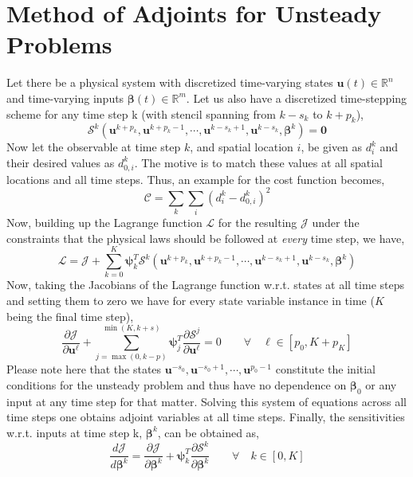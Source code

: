 \documentclass{article}
\begin{document}
\section{Method of Adjoints for Unsteady Problems}
    Let there be a physical system with discretized time-varying states $\boldsymbol{u}(t)\in\mathbb{R}^n$ and time-varying inputs $\boldsymbol{\beta}(t)\in
    \mathbb{R}^m$. Let us also have a discretized time-stepping scheme for any time step k (with stencil spanning from $k-s_k$ to $k+p_k$),
    $$
    \boldsymbol{\mathcal{S}}^k(\boldsymbol{u}^{k+p_k},   \boldsymbol{u}^{k+p_k-1}, \cdots, 
                               \boldsymbol{u}^{k-s_k+1}, \boldsymbol{u}^{k-s_k},   \boldsymbol{\beta}^k) = \boldsymbol{0}
    $$
    Now let the observable at time step $k$, and spatial location $i$, be given as $d_i^k$ and their desired values as $d_{0,i}^k$. The motive is to match these
    values at all spatial locations and all time steps. Thus, an example for the cost function becomes,
    $$
    \mathscr{C} = \sum_{k}{\sum_{i}{\left(d_i^k - d_{0,i}^k\right)^2}}
    $$
    Now, building up the Lagrange function $\mathscr{L}$ for the resulting $\mathscr{J}$ under the constraints that the physical laws should be followed at
    \textit{every} time step, we have,
    $$
    \mathscr{L} = \mathscr{J} + \sum_{k=0}^K{\boldsymbol{\psi}_k^T \boldsymbol{\mathcal{S}}^k(\boldsymbol{u}^{k+p_k},   \boldsymbol{u}^{k+p_k-1}, \cdots,
                                                                                \boldsymbol{u}^{k-s_k+1}, \boldsymbol{u}^{k-s_k},   \boldsymbol{\beta}^k)}
    $$
    Now, taking the Jacobians of the Lagrange function w.r.t. states at all time steps and setting them to zero we have for every state variable instance in time 
    ($K$ being the final time step),
    $$
    \frac{\partial\mathscr{J}}{\partial\boldsymbol{u}^\ell} + 
    \sum_{j=\max(0,k-p)}^{\min(K,k+s)}{\boldsymbol{\psi}_j^T \frac{\partial\boldsymbol{\mathcal{S}}^j}{\partial\boldsymbol{u}^\ell}} = 0 
    \qquad\forall\quad\ell\in[p_0,K+p_K]
    $$
    Please note here that the states $\boldsymbol{u}^{-s_0},\boldsymbol{u}^{-s_0+1},\cdots,\boldsymbol{u}^{p_0-1}$ constitute the initial conditions for the 
    unsteady problem and thus have no dependence on $\boldsymbol{\beta}_0$ or any input at any time step for that matter. Solving this system of equations 
    across all time steps one obtains adjoint variables at all time steps. Finally, the sensitivities w.r.t. inputs at time step k, $\boldsymbol{\beta}^k$, 
    can be obtained as,
    $$
    \frac{d\mathscr{J}}{d\boldsymbol{\beta}^k} = \frac{\partial\mathscr{J}}{\partial\boldsymbol{\beta}^k} + 
    \boldsymbol{\psi}_k^T \frac{\partial\boldsymbol{\mathcal{S}}^k}{\partial\boldsymbol{\beta}^k} 
    \qquad\forall\quad k\in[0,K]
    $$
%
%
\end{document}

